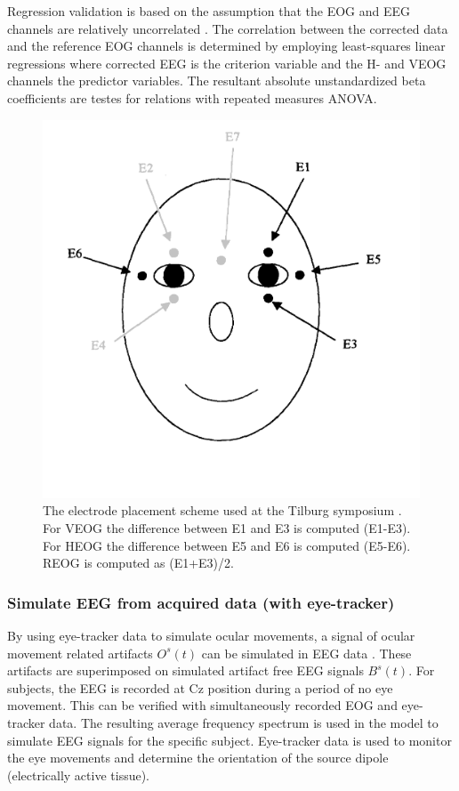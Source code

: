 \documentclass[twoside]{article}
\begin{document}
Regression validation is based on the assumption that the EOG and EEG channels are relatively uncorrelated \cite{evaleog}. The correlation between the corrected data and the reference EOG channels is determined by employing least-squares linear regressions where corrected EEG is the criterion variable and the H- and VEOG channels the predictor variables. The resultant absolute unstandardized beta coefficients are testes for relations with repeated measures ANOVA. 

\begin{figure}
\centering

  \includegraphics[width=.5\linewidth]{tilburgscheme}
  \caption{The electrode placement scheme used at the Tilburg symposium \cite{eogplacement}. For VEOG the difference between E1 and E3 is computed (E1-E3). For HEOG the difference between E5 and E6 is computed (E5-E6). REOG is computed as (E1+E3)/2. }
  

\label{fig:eogplaecment}
\end{figure}

\subsubsection{Simulate EEG from acquired data (with eye-tracker)}
By using eye-tracker data to simulate ocular movements, a signal of ocular movement related artifacts $O^s(t)$ can be simulated in EEG data \cite{SNR}. These artifacts are superimposed on simulated artifact free EEG signals $B^s(t)$. For subjects, the EEG is recorded at Cz position during a period of no eye movement. This can be verified with simultaneously recorded EOG and eye-tracker data. The resulting average frequency spectrum is used in the model to simulate EEG signals for the specific subject. Eye-tracker data is used to monitor the eye movements and determine the orientation of the source dipole (electrically active tissue).
\end{document}

